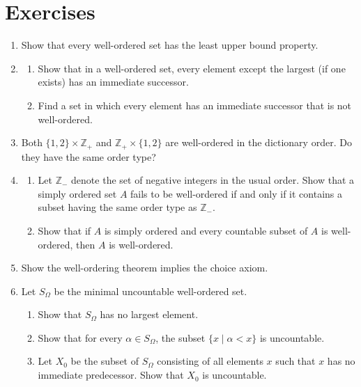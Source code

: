\section*{Exercises}
\begin{enumerate}[itemsep=0.4em, parsep=0pt, topsep=0pt, partopsep=0pt, leftmargin=*, label=\arabic*., ref=\arabic*]
\item Show that every well-ordered set has the least upper bound property.
\item
  \begin{enumerate}[itemsep=0.2em, parsep=0pt, topsep=0pt, partopsep=0pt, leftmargin=*, label=(\alph*), align=left]
  \item Show that in a well-ordered set, every element except the largest (if one exists) has an immediate successor.
  \item Find a set in which every element has an immediate successor that is not well-ordered.
  \end{enumerate}
\item Both \(\{1,2\} \times {\mathbb{Z}}_{+}\) and \(\mathbb{Z}_{+} \times \{1,2\}\) are well-ordered in the dictionary order. Do they have the same order type?
\item
  \begin{enumerate}[itemsep=0.2em, parsep=0pt, topsep=0pt, partopsep=0pt, leftmargin=*, label=(\alph*), align=left]
  \item Let \(\mathbb{Z}_{ - }\) denote the set of negative integers in the usual order. Show that a simply ordered set \(A\) fails to be well-ordered if and only if it contains a subset having the same order type as \(\mathbb{Z}_{ - }\).
  \item Show that if \(A\) is simply ordered and every countable subset of \(A\) is well-ordered, then \(A\) is well-ordered.
  \end{enumerate}
\item Show the well-ordering theorem implies the choice axiom.
\item Let \(S_{\Omega }\) be the minimal uncountable well-ordered set.
  \begin{enumerate}[itemsep=0.2em, parsep=0pt, topsep=0pt, partopsep=0pt, leftmargin=*, label=(\alph*), align=left]
  \item Show that \(S_{\Omega }\) has no largest element.
  \item Show that for every \(\alpha \in {S}_{\Omega }\), the subset \(\{ x \mid \alpha < x\}\) is uncountable.
  \item Let \(X_{0}\) be the subset of \(S_{\Omega }\) consisting of all elements \(x\) such that \(x\) has no immediate predecessor. Show that \(X_{0}\) is uncountable.

\end{enumerate}
\end{enumerate}
